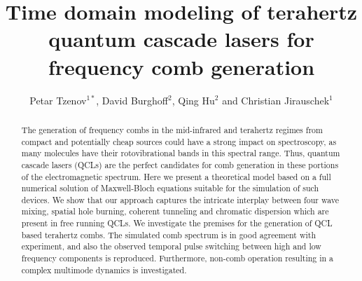 \documentclass[10pt,letterpaper]{article}%
\begin{document}
\title{Time domain modeling of terahertz quantum cascade lasers for frequency comb generation}
\author{Petar Tzenov$^{1*}$, David Burghoff$^{2}$, Qing Hu$^{2}$ and Christian
Jirauschek$^{1}$}

\begin{abstract}
The generation of frequency combs in the mid-infrared and terahertz regimes
from compact and potentially cheap sources could have a strong impact on
spectroscopy, as many molecules have their rotovibrational bands in this
spectral range. Thus, quantum cascade lasers (QCLs) are the perfect candidates
for comb generation in these portions of the electromagnetic spectrum. Here we
present a theoretical model based on a full numerical solution of
Maxwell-Bloch equations suitable for the simulation of such devices. We show
that our approach captures the intricate interplay between four wave mixing,
spatial hole burning, coherent tunneling and chromatic dispersion which are
present in free running QCLs. We investigate the premises for the generation
of QCL based terahertz combs. The simulated comb spectrum is in good agreement
with experiment, and also the observed temporal pulse switching between high
and low frequency components is reproduced. Furthermore, non-comb operation
resulting in a complex multimode dynamics is investigated.
\end{abstract}


\address{$^{1}$ Institute for Nanoelectronics, Technical University f Munich,
D-80333 Munich, Germany} \address{$^{2}$ Department of Electrical Engineering
and Computer Science, Research Laboratory of Electronics, Massachusetts
Institute of Technology, Cambridge, Massachusetts 02139, USA}








\end{document}
